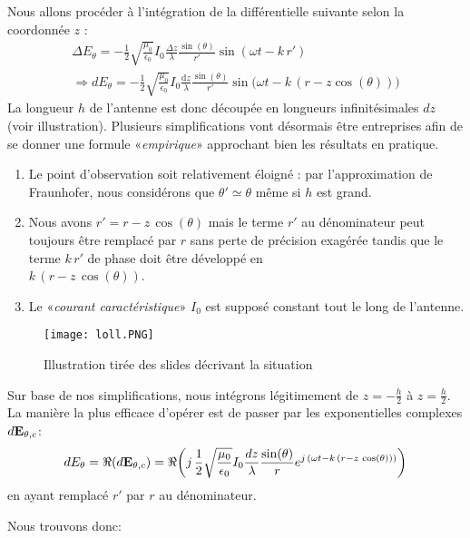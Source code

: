 Nous allons procéder à l'intégration de la différentielle suivante selon la coordonnée $z$ : \begin{multline*} \Delta E_{\theta} = -\frac{1}{2}\sqrt{\frac{\mu_0}{\epsilon_0}}I_0 \frac{\Delta z}{\lambda}\frac{\sin(\theta)}{r'}\sin(\omega t-k\, r') \\ \Rightarrow dE_{\theta} = -\frac{1}{2}\sqrt{\frac{\mu_0}{\epsilon_0}}I_0 \frac{\textrm{d}z}{\lambda}\frac{\sin(\theta)}{r'}\sin\Big(\omega t-k\, (r-z\cos(\theta))\Big) \end{multline*}
La longueur $h$ de l'antenne est donc découpée en longueurs infinitésimales $dz$ (voir illustration). Plusieurs simplifications vont désormais être entreprises afin de se donner une formule «\textit{empirique}» approchant bien les résultats en pratique. 

\begin{enumerate}
\item Le point d'observation soit relativement éloigné : par l'approximation de Fraunhofer, nous considérons que $\theta ' \simeq \theta$ même si $h$ est grand.
\item Nous avons $r' = r - z\,\cos(\theta)$ mais le terme $r'$ au dénominateur peut toujours être remplacé par $r$ sans perte de précision exagérée tandis que le terme $k\,r'$ de phase doit être développé en\\ $k\,(r - z\,\cos(\theta))$.
\item Le «\textit{courant caractéristique}» $I_0$ est supposé constant tout le long de l'antenne. 
\end{enumerate}

\begin{figure}[h]\centering
\texttt{[image: loll.PNG]}
\caption{Illustration tirée des slides décrivant la situation}
\label{fig:ae2}
\end{figure}

Sur base de nos simplifications, nous intégrons légitimement de $z=-\frac{h}{2}$ à $z=\frac{h}{2}$. La manière la plus efficace d'opérer est de passer par les exponentielles complexes $d\bold{E}_{\theta,c}$:
\[ dE_{\theta}=\Re(d\bold{E}_{\theta,c}) =  \Re\bigg(j\,\frac{1}{2}\sqrt{\frac{\mu_0}{\epsilon_0}}I_0 \frac{dz}{\lambda}\frac{\sin(\theta)}{r}e^{j\,(\omega t-k\,(r-z\,\cos(\theta)))}\bigg)\]
en ayant remplacé $r'$ par $r$ au dénominateur.

Nous trouvons donc: 

